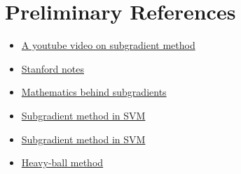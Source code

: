 \documentclass[twoside,twocolumn]{article}
\begin{document}
\section{Preliminary References}
\begin{itemize}
    \item \href{https://www.youtube.com/watch?v=jYtCiV1aP44}{A youtube video on subgradient method}
    \item \href{https://web.stanford.edu/class/ee392o/subgrad_method.pdf}{Stanford notes}
    \item \href{https://www.stat.cmu.edu/~ryantibs/convexopt-S15/scribes/06-subgradients-scribed.pdf}{Mathematics behind subgradients}
    \item \href{https://mcneela.github.io/machine_learning/2020/04/24/Subgradient-Descent.html}{Subgradient method in SVM}
    \item \href{https://davidrosenberg.github.io/mlcourse/Archive/2018/Lectures/03c.subgradient-descent.pdf}{Subgradient method in SVM}
    \item \href{https://web.stanford.edu/class/ee364b/lectures/subgrad_method_notes.pdf}{Heavy-ball method}
\end{itemize}
\end{document}
